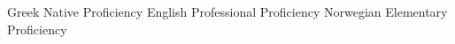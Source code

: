 
\begin{cventries}
    \cventryii
        {Greek}
        {Native Proficiency}
    \cventryii
        {English}
        {Professional Proficiency}
    \cventryii
        {Norwegian}
        {Elementary Proficiency}
\end{cventries}
